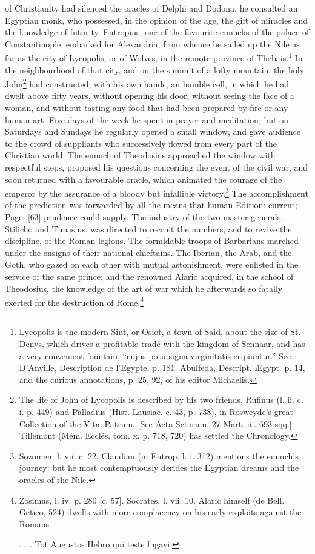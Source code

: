 of Christianity had silenced the oracles of Delphi and Dodona, he consulted an Egyptian monk, who possessed, in the opinion of the age, the gift of miracles and the knowledge of futurity. Eutropius, one of the favourite eunuchs of the palace of Constantinople, embarked for Alexandria, from whence he sailed up the Nile as far as the city of Lycopolis, or of Wolves, in the remote province of Thebais.\footnote{Lycopolis is the modern Siut, or Osiot, a town of Said, about the size of St. Denys, which drives a profitable trade with the kingdom of Sennaar, and has a very convenient fountain, \texthebrew{“}cujus potu signa virginitatis eripiuntur.\texthebrew{}” See D\texthebrew{}’Anville, Description de l\texthebrew{}’Egypte, p. 181. Abulfeda, Descript. Ægypt. p. 14, and the curious annotations, p. 25, 92, of his editor Michaelis.} In the neighbourhood of that city, and on the summit of a lofty mountain, the holy John\footnote{The life of John of Lycopolis is described by his two friends, Rufinus (l. ii. c. i. p. 449) and Palladius (Hist. Lausiac. c. 43, p. 738), in Rosweyde\texthebrew{}’s great Collection of the Vitæ Patrum. [See Acta Sctorum, 27 Mart. iii. 693 sqq.] Tillemont (Mém. Ecclés. tom. x. p. 718, 720) has settled the Chronology.} had constructed, with his own hands, an humble cell, in which he had dwelt above fifty years, without opening his door, without seeing the face of a woman, and without tasting any food that had been prepared by fire or any human art. Five days of the week he spent in prayer and meditation; but on Saturdays and Sundays he regularly opened a small window, and gave audience to the crowd of suppliants who successively flowed from every part of the Christian world. The eunuch of Theodosius approached the window with respectful steps, proposed his questions concerning the event of the civil war, and soon returned with a favourable oracle, which animated the courage of the emperor by the assurance of a bloody but infallible victory.\footnote{Sozomen, l. vii. c. 22. Claudian (in Eutrop. l. i. 312) mentions the eunuch\texthebrew{}’s journey: but he most contemptuously derides the Egyptian dreams and the oracles of the Nile.} The accomplishment of the prediction was forwarded by all the means that human Edition: current; Page: [63] prudence could supply. The industry of the two master-generals, Stilicho and Timasius, was directed to recruit the numbers, and to revive the discipline, of the Roman legions. The formidable troops of Barbarians marched under the ensigns of their national chieftains. The Iberian, the Arab, and the Goth, who gazed on each other with mutual astonishment, were enlisted in the service of the same prince; and the renowned Alaric acquired, in the school of Theodosius, the knowledge of the art of war which he afterwards so fatally exerted for the destruction of Rome.\footnote{Zosimus, l. iv. p. 280 [c. 57]. Socrates, l. vii. 10. Alaric himself (de Bell. Getico, 524) dwells with more complacency on his early exploits against the Romans.

. . . Tot Augustos Hebro qui teste fugavi.}


